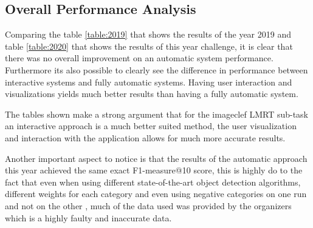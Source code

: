 \subsection{Overall Performance Analysis}

Comparing the table \ref{table:2019} that shows the results of the year 2019 and table \ref{table:2020} that shows the results of this year challenge, it is clear that there was no overall improvement on an automatic system performance. Furthermore its also possible to clearly see the difference in performance between interactive systems and fully automatic systems. Having user interaction and visualizations yields much better results than having a fully automatic system.

The tables shown make a strong argument that for the imageclef LMRT sub-task an interactive approach is a much better suited method,  the user visualization and interaction with the application allows for much more accurate results.

Another important aspect to notice is that the results of the automatic approach this year achieved the same exact F1-measure@10 score, this is highly do to the fact that even when using different state-of-the-art object detection algorithms, different weights for each category and even using negative categories on one run and not on the other , much of the data used was provided by the organizers which is a highly faulty and inaccurate data.



